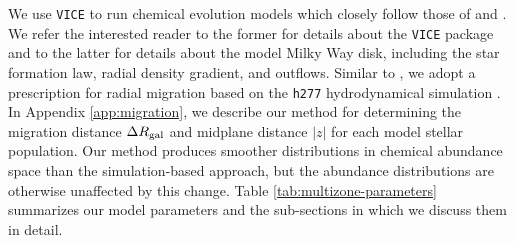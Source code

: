 \documentclass[twocolumn,twocolappendix]{aastex631}
\newcommand{\vice}{{\tt VICE}\xspace}
\newcommand{\hydro}{{\tt h277}\xspace}
\begin{document}
We use \vice to run chemical evolution models which closely follow those of \citet{JohnsonWeinberg2020-Starbursts} and \citet[][hereafter ]{Johnson2021-Migration}. We refer the interested reader to the former for details about the \vice package and to the latter for details about the model Milky Way disk, including the star formation law, radial density gradient, and outflows. Similar to , we adopt a prescription for radial migration based on the \hydro hydrodynamical simulation \citep{Christensen2012-h277}. In Appendix \ref{app:migration}, we describe our method for determining the migration distance $\Delta R_{\rm gal}$ and midplane distance $|z|$ for each model stellar population. Our method produces smoother distributions in chemical abundance space than the simulation-based approach, but the abundance distributions are otherwise unaffected by this change. Table \ref{tab:multizone-parameters} summarizes our model parameters and the sub-sections in which we discuss them in detail.
\end{document}
